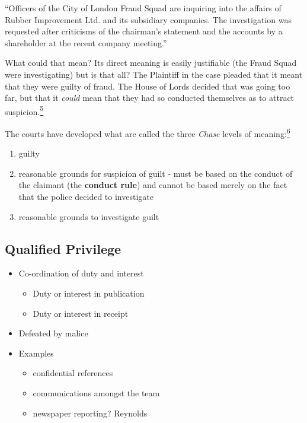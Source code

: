 \documentclass[]{article}
\begin{document}
``Officers of the City of London Fraud Squad are inquiring into the
affairs of Rubber Improvement Ltd. and its subsidiary companies. The
investigation was requested after criticisms of the chairman's statement
and the accounts by a shareholder at the recent company meeting.''

{{What could that mean? Its direct meaning is easily justifiable (the
Fraud Squad were investigating) but is that all? The Plaintiff in the
case pleaded that it meant that they were guilty of fraud. The House of
Lords decided that was going too far, but that it }}\emph{{could
}}{{mean that they had so conducted themselves as to attract
suspicion.\hyperref[sdfootnote5sym]{\textsuperscript{5}}}}

{{The courts have developed what are called the three }}\emph{{Chase}}{{
levels of meaning:\hyperref[sdfootnote6sym]{\textsuperscript{6}}}}

\begin{enumerate}
\item
  guilty
\item
  {{reasonable grounds for suspicion of guilt - must be based on the
  conduct of the claimant (the }}{\textbf{conduct rule}}{{) and cannot
  be based merely on the fact that the police decided to investigate}}
\item
  reasonable grounds to investigate guilt
\end{enumerate}

\subsection{Qualified Privilege}

\begin{itemize}
\item
  Co-ordination of duty and interest

  \begin{itemize}
  \item
    Duty or interest in publication
  \item
    Duty or interest in receipt
  \end{itemize}
\item
  Defeated by malice
\item
  Examples

  \begin{itemize}
  \item confidential references
  \item communications amongst the team
  \item newspaper reporting? Reynolds
  \end{itemize}
\end{itemize}
\end{document}
